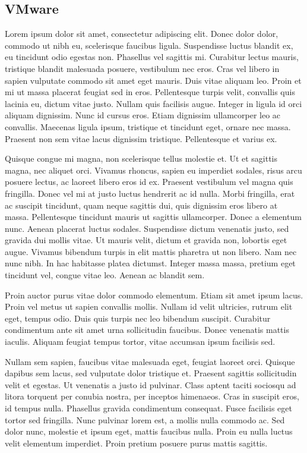 \documentclass[a4paper,12pt]{report}
\begin{document}

\subsection{VMware} %
Lorem ipsum dolor sit amet, consectetur adipiscing elit. Donec dolor dolor, commodo ut nibh eu, scelerisque faucibus ligula. Suspendisse luctus blandit ex, eu tincidunt odio egestas non. Phasellus vel sagittis mi. Curabitur lectus mauris, tristique blandit malesuada posuere, vestibulum nec eros. Cras vel libero in sapien vulputate commodo sit amet eget mauris. Duis vitae aliquam leo. Proin et mi ut massa placerat feugiat sed in eros. Pellentesque turpis velit, convallis quis lacinia eu, dictum vitae justo. Nullam quis facilisis augue. Integer in ligula id orci aliquam dignissim. Nunc id cursus eros. Etiam dignissim ullamcorper leo ac convallis. Maecenas ligula ipsum, tristique et tincidunt eget, ornare nec massa. Praesent non sem vitae lacus dignissim tristique. Pellentesque et varius ex.

Quisque congue mi magna, non scelerisque tellus molestie et. Ut et sagittis magna, nec aliquet orci. Vivamus rhoncus, sapien eu imperdiet sodales, risus arcu posuere lectus, ac laoreet libero eros id ex. Praesent vestibulum vel magna quis fringilla. Donec vel mi at justo luctus hendrerit ac id nulla. Morbi fringilla, erat ac suscipit tincidunt, quam neque sagittis dui, quis dignissim eros libero at massa. Pellentesque tincidunt mauris ut sagittis ullamcorper. Donec a elementum nunc. Aenean placerat luctus sodales. Suspendisse dictum venenatis justo, sed gravida dui mollis vitae. Ut mauris velit, dictum et gravida non, lobortis eget augue. Vivamus bibendum turpis in elit mattis pharetra ut non libero. Nam nec nunc nibh. In hac habitasse platea dictumst. Integer massa massa, pretium eget tincidunt vel, congue vitae leo. Aenean ac blandit sem.

Proin auctor purus vitae dolor commodo elementum. Etiam sit amet ipsum lacus. Proin vel metus ut sapien convallis mollis. Nullam id velit ultricies, rutrum elit eget, tempus odio. Duis quis turpis nec leo bibendum suscipit. Curabitur condimentum ante sit amet urna sollicitudin faucibus. Donec venenatis mattis iaculis. Aliquam feugiat tempus tortor, vitae accumsan ipsum facilisis sed.

Nullam sem sapien, faucibus vitae malesuada eget, feugiat laoreet orci. Quisque dapibus sem lacus, sed vulputate dolor tristique et. Praesent sagittis sollicitudin velit et egestas. Ut venenatis a justo id pulvinar. Class aptent taciti sociosqu ad litora torquent per conubia nostra, per inceptos himenaeos. Cras in suscipit eros, id tempus nulla. Phasellus gravida condimentum consequat. Fusce facilisis eget tortor sed fringilla. Nunc pulvinar lorem est, a mollis nulla commodo ac. Sed dolor nunc, molestie et ipsum eget, mattis faucibus nulla. Proin eu nulla luctus velit elementum imperdiet. Proin pretium posuere purus mattis sagittis.
\end{document}
